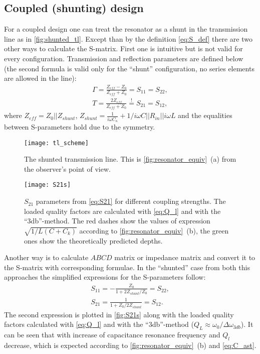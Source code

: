 \documentclass[12pt, twoside]{report}
\numberwithin{equation}{section}
\begin{document}
\subsection{Coupled (shunting) design}
For a coupled design one can treat the resonator as a shunt in the transmission line as in \autoref{fig:shunted_tl}. Except than by the definition \eqref{eq:S_def} there are two other ways to calculate the S-matrix. First one is intuitive but is not valid for every configuration. Transmission and reflection parameters are defined\cite{Kiselev2013} below (the second formula is valid only for the ``shunt'' configuration, no series elements are allowed in the line):
\begin{gather}    
\Gamma = \frac{Z_{eff} - Z_{0}}{Z_{eff} + Z_{0}} = S_{11} = S_{22}, \label{eGamma}\\
T = \frac{2Z_{eff}}{Z_{eff}+Z_0} \overset{!}{=} S_{21} = S_{12}, \label{eT}
\end{gather}
where $Z_{eff} = Z_0 || Z_{shunt}$, $Z_{shunt} = \frac{1}{i\omega C_\kappa} + 1/i\omega C||R_{in}||i\omega L$ and the equalities between S-parameters hold due to the symmetry.
\begin{figure}[h]
\centering
\texttt{[image: tl\_scheme]}
\caption{The shunted transmission line. This is \autoref{fig:resonator_equiv}~(a)  from the observer's point of view.}
\label{fig:shunted_tl}
\end{figure}
\begin{figure}[h]
\centering
\texttt{[image: S21s]}
\caption{ $S_{21}$ parameters from \eqref{eq:S21} for different coupling strengths. The loaded quality factors are calculated with \eqref{eq:Q_l} and with the ``3db''-method. The red dashes show the values of expression $\sqrt{1/L(C+C_k)}$ according to \autoref{fig:resonator_equiv}~(b), the green ones show the theoretically predicted depths.}
\label{fig:S21s}
\end{figure}

Another way is to calculate $ABCD$ matrix or impedance matrix and convert it to the S-matrix with corresponding formulae\cite{pozar2012}. In the ``shunted'' case from both this approaches the simplified expressions for the S-parameters follow:
\begin{gather}
S_{11} = -\frac{Z_0}{1 + 2Z_{shunt}/Z_0} = S_{22}, \\
S_{21} = \frac{1}{1+Z_0/2Z_{shunt}} = S_{12}. \label{eq:S21}
\end{gather}
The second expression is plotted in \autoref{fig:S21s} along with the loaded quality factors calculated with \eqref{eq:Q_l} and with the ``3db''-method ($Q_L \approx \omega_0/\Delta\omega_{3db}$). It can be seen that with increase of capacitance resonance frequency and $Q_l$ decrease, which is expected according to \autoref{fig:resonator_equiv}~(b) and \eqref{eq:C_ast}.
\end{document}

